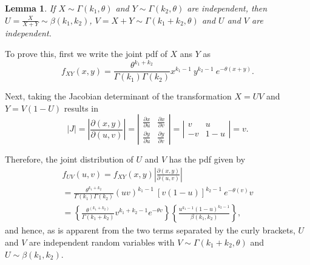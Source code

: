 \documentclass[10pt,journal,comsoc,final]{IEEEtran}
\newtheorem{lemma}{Lemma}
\begin{document}
\begin{lemma} If $X \sim \Gamma(k_1, \theta)$ and $Y \sim \Gamma(k_2, \theta)$ are independent, then $U = \frac{X}{X+Y} \sim \beta(k_1,k_2)$, $V = X + Y \sim \Gamma(k_{1} + k_{2}, \theta)$ and $U$ and $V$ are independent.
\end{lemma}
\begin{IEEEproof} To prove this, first we write the joint pdf of $X$ ans $Y$ as
\begin{equation}\label{eq:lemma3_1}
f_{XY}(x,y) = \frac{\theta^{k_1+ k_2}}{\Gamma(k_1) \Gamma(k_2)} x^{k_1 - 1} \ y^{k_2 - 1} \ e^{-\theta(x+y)}.
\end{equation}

Next, taking the Jacobian determinant of the transformation $X = UV$ and $Y = V(1-U)$ results in
\begin{equation}\label{eq:lemma3_2}
 \left| J \right| = \left| \frac{\partial(x,y)}{\partial(u,v)} \right| = \left| \begin{array}{cc}
\frac{\partial x}{\partial u} & \frac{\partial x}{\partial v} \\
\frac{\partial y}{\partial u} & \frac{\partial y}{\partial v} \end{array} \right| = \left| \begin{array}{cc}
v & u \\
-v & 1-u \end{array} \right| = v.
\end{equation}

Therefore, the joint distribution of $U$ and $V$ has the pdf given by
\begin{equation}\label{eq:lemma3_3}
\begin{split}
f_{UV}(u,v) = f_{XY}(x,y) \left| \frac{\partial(x,y)}{\partial(u,v)} \right| \\ = \frac{\theta^{k_1+ k_2}}{\Gamma(k_1) \Gamma(k_2)} (uv)^{k_1 - 1} \ \left[ v(1-u)\right]^{k_2 - 1} \ e^{-\theta(v)}v \\ = \left\lbrace \frac{\theta^{(k_1 + k_2)}}{\Gamma(k_1 + k_2)} v^{k_1 + k_2 - 1} e^{-\theta v} \right\rbrace  \left\lbrace \frac{u^{k_1 - 1} (1-u)^{k_2 - 1}}{\beta(k_1,k_2)} \right\rbrace,
\end{split}
\end{equation}
and hence, as is apparent from the two terms separated by the curly brackets, $U$ and $V$ are independent random variables with $V \sim \Gamma(k_1 + k_2, \theta)$ and $U \sim \beta(k_1,k_2)$.
\end{IEEEproof}
\end{document}
